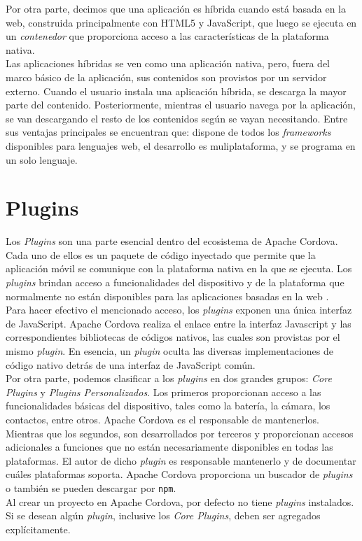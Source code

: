 Por otra parte, decimos que una aplicación es híbrida cuando está basada en la web, construida principalmente con HTML5 y JavaScript, que luego se ejecuta en un \emph{contenedor} que proporciona acceso a las características de la plataforma nativa.\\

Las aplicaciones híbridas se ven como una aplicación nativa, pero, fuera del marco básico de la aplicación, sus contenidos son provistos por un servidor externo. Cuando el usuario instala una aplicación híbrida, se descarga la mayor parte del contenido. Posteriormente, mientras el usuario navega por la aplicación, se van descargando el resto de los contenidos según se vayan necesitando. Entre sus ventajas principales se encuentran que: dispone de todos los \emph{frameworks} disponibles para lenguajes web, el desarrollo es muliplataforma, y se programa en un solo lenguaje.
\section{Plugins}
Los \emph{Plugins} son una parte esencial dentro del ecosistema de Apache Cordova. Cada uno de ellos es un paquete de código inyectado que permite que la aplicación móvil se comunique con la plataforma nativa en la que se ejecuta. Los \emph{plugins} brindan acceso a funcionalidades del dispositivo y de la plataforma que normalmente no están disponibles para las aplicaciones basadas en la web \cite{ACP}.\\

Para hacer efectivo el mencionado acceso, los \emph{plugins} exponen una única interfaz de JavaScript. Apache Cordova realiza el enlace entre la interfaz Javascript y las correspondientes bibliotecas de códigos nativos, las cuales son provistas por el mismo \emph{plugin}. En esencia, un \emph{plugin} oculta las diversas implementaciones de código nativo detrás de una interfaz de JavaScript común.\\

Por otra parte, podemos clasificar a los \emph{plugins} en dos grandes grupos: \emph{Core Plugins} y \emph{Plugins Personalizados}. Los primeros proporcionan acceso a las funcionalidades básicas del dispositivo, tales como la batería, la cámara, los contactos, entre otros. Apache Cordova es el responsable de mantenerlos. Mientras que los segundos, son desarrollados por terceros y proporcionan accesos adicionales a funciones que no están necesariamente disponibles en todas las plataformas. El autor de dicho \emph{plugin} es responsable mantenerlo y de documentar cuáles plataformas soporta. Apache Cordova proporciona un buscador de \emph{plugins} o también se pueden descargar por \texttt{npm}.\\

Al crear un proyecto en Apache Cordova, por defecto no tiene \emph{plugins} instalados. Si se desean algún \emph{plugin}, inclusive los \emph{Core Plugins}, deben ser agregados explícitamente.